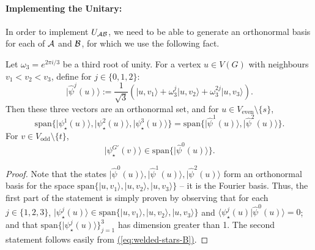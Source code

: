 \documentclass{theoretics}
\newcommand{\eq}[1]{\hyperref[eq:#1]{(\ref*{eq:#1})}}
\def\ket#1{{\lvert}#1\rangle}
\renewcommand{\>}{\rangle}
\newcommand{\<}{\langle}
\renewcommand{\(}{\left(}
\renewcommand{\)}{\right)}
\def\braket#1#2{{{\langle}#1\vert}#2\rangle}
\begin{document}
\paragraph{Implementing the Unitary:} In order to implement $U_{\cal AB}$, we need to be able to generate an orthonormal basis for each of ${\cal A}$ and ${\cal B}$, for which we use the following fact. 
\begin{claim}\label{clm:welded-F-basis}
Let $\omega_3=e^{2\pi i/3}$ be a third root of unity.
For a vertex $u\in V(G)$ with neighbours $v_1<v_2<v_3$, define for $j\in\{0,1,2\}$:
$$\ket{\widehat\psi^j(u)}:=\frac{1}{\sqrt{3}}\left(\ket{u,v_1}+\omega_3^j\ket{u,v_2}+\omega_3^{2j}\ket{u,v_3}\right).$$
Then these three vectors are an orthonormal set, and for $u\in V_{\mathrm{even}}\setminus\{s\}$,
$$\mathrm{span}\{\ket{\psi_\star^1(u)},\ket{\psi_\star^2(u)},\ket{\psi_\star^3(u)}\}=\mathrm{span}\{\ket{\widehat\psi^1(u)},\ket{\widehat\psi^2(u)}\}.$$
For $v\in V_{\mathrm{odd}}\setminus \{t\}$, 
$$\ket{\psi_\star^{G'}(v)}\in\mathrm{span}\{\ket{\widehat\psi^0(u)}\}.$$
\end{claim}
\begin{proof}
Note that the states $\ket{\widehat{\psi}^0(u)},\ket{\widehat{\psi}^1(u)},\ket{\widehat{\psi}^2(u)}$ form an orthonormal basis for the space $\mathrm{span}\{\ket{u,v_1},\ket{u,v_2},\ket{u,v_3}\}$ -- it is the Fourier basis. Thus, the first part of the statement is simply proven by observing that for each $j\in\{1,2,3\}$, $\ket{\psi_\star^j(u)}\in\mathrm{span}\{\ket{u,v_1},\ket{u,v_2},\ket{u,v_3}\}$ and $\braket{\psi_\star^j(u)}{\widehat{\psi}^0(u)}=0$; and that $\mathrm{span}\{\ket{\psi_\star^j(u)}\}_{j=1}^3$ has dimension greater than 1.
The second statement follows easily from \eq{welded-stars-B}.
\end{proof}
\end{document}
